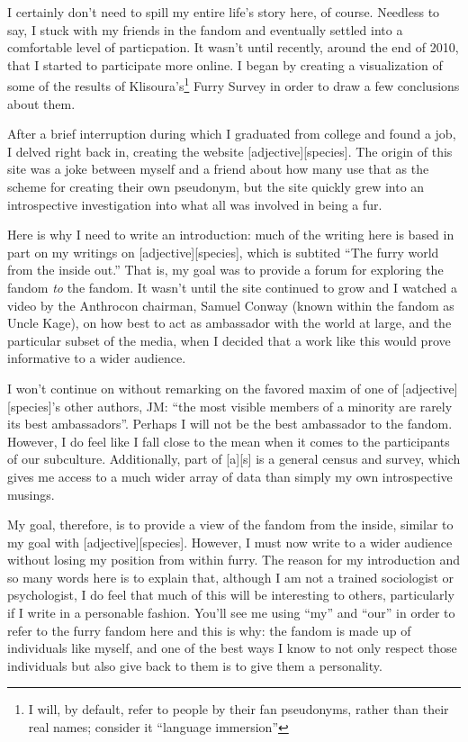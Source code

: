 I certainly don't need to spill my entire life's story here, of course. Needless to say, I stuck with my friends in the fandom and eventually settled into a comfortable level of particpation. It wasn't until recently, around the end of 2010, that I started to participate more online. I began by creating a visualization of some of the results of Klisoura's\footnote{I will, by default, refer to people by their fan pseudonyms, rather than their real names; consider it ``language immersion''} Furry Survey in order to draw a few conclusions about them.

After a brief interruption during which I graduated from college and found a job, I delved right back in, creating the website {[}adjective{]}{[}species{]}. The origin of this site was a joke between myself and a friend about how many use that as the scheme for creating their own pseudonym, but the site quickly grew into an introspective investigation into what all was involved in being a fur.

Here is why I need to write an introduction: much of the writing here is based in part on my writings on {[}adjective{]}{[}species{]}, which is subtited ``The furry world from the inside out.'' That is, my goal was to provide a forum for exploring the fandom \emph{to} the fandom. It wasn't until the site continued to grow and I watched a video by the Anthrocon chairman, Samuel Conway (known within the fandom as Uncle Kage), on how best to act as ambassador with the world at large, and the particular subset of the media, when I decided that a work like this would prove informative to a wider audience.

I won't continue on without remarking on the favored maxim of one of {[}adjective{]}{[}species{]}'s other authors, JM: ``the most visible members of a minority are rarely its best ambassadors''. Perhaps I will not be the best ambassador to the fandom. However, I do feel like I fall close to the mean when it comes to the participants of our subculture. Additionally, part of {[}a{]}{[}s{]} is a general census and survey, which gives me access to a much wider array of data than simply my own introspective musings.

My goal, therefore, is to provide a view of the fandom from the inside, similar to my goal with {[}adjective{]}{[}species{]}. However, I must now write to a wider audience without losing my position from within furry. The reason for my introduction and so many words here is to explain that, although I am not a trained sociologist or psychologist, I do feel that much of this will be interesting to others, particularly if I write in a personable fashion. You'll see me using ``my'' and ``our'' in order to refer to the furry fandom here and this is why: the fandom is made up of individuals like myself, and one of the best ways I know to not only respect those individuals but also give back to them is to give them a personality.

